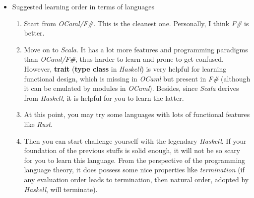 \documentclass{article}
\begin{document}
\begin{itemize}
\begin{itemize}
    \end{itemize}
    \item Suggested learning order in terms of languages
    \begin{enumerate}
        \item Start from \emph{OCaml/F\#}. This is the cleanest one. Personally, I think \emph{F\#} is better.
        \item Move on to \emph{Scala}. It has a lot more features and programming paradigms than \emph{OCaml/F\#}, thus harder to learn and prone to get confused. However, \textbf{trait} (\textbf{type class} in \emph{Haskell}) is very helpful for learning functional design, which is missing in \emph{OCaml} but present in \emph{F\#} (although it can be emulated by modules in \emph{OCaml}). Besides, since \emph{Scala} derives from \emph{Haskell}, it is helpful for you to learn the latter.
        \item At this point, you may try some languages with lots of functional features like \emph{Rust}.
        \item Then you can start challenge yourself with the legendary \emph{Haskell}. If your foundation of the previous stuffs is solid enough, it will not be so scary for you to learn this language. From the perspective of the programming language theory, it does possess some nice properties like \emph{termination} (if any evaluation order leads to termination, then natural order, adopted by \emph{Haskell}, will terminate).
        \end{enumerate}
\end{itemize}
\end{document}

